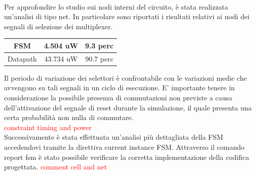 \documentclass[11pt,  english, makeidx, a4paper, titlepage, oneside]{book}
\begin{document}
\\
Per approfondire lo studio sui nodi interni del circuito, è stata realizzata un'analisi di tipo net. In particolare sono riportati i risultati relativi ai nodi dei segnali di selezione dei multiplexer.
\begin{center}
	\begin{tabular}{|c|c|c|}
	\hline
	FSM & 4.504 uW & 9.3 perc \\
	\hline
	Datapath & 43.734 uW & 90.7 perc \\
	\hline
	\end{tabular}	
\end{center}
\vspace{0.3cm} 
Il periodo di variazione dei selettori è confrontabile con le variazioni medie che avvengono su tali segnali in un ciclo di esecuzione. E' importante tenere in considerazione la possibile presenza di commutazioni non previste a causa dell'attivazione del segnale di reset durante la simulazione, il quale presenta una certa probabilità non nulla di commutare.
\\
\textcolor{red}{constraint timing and power}
\\
Successivamente è stata effettuata un'analisi più dettagliata della FSM accedendovi tramite la direttiva current instance FSM.
Attraverso il comando report fsm è stato possibile verificare la corretta implementazione della codifica progettata.
\textcolor{red}{comment cell and net}






















































          
          
          
          
          
          
          
          
          
          
          
          
          
          
          
          
          
          
          
          
          
          
          
\end{document}
